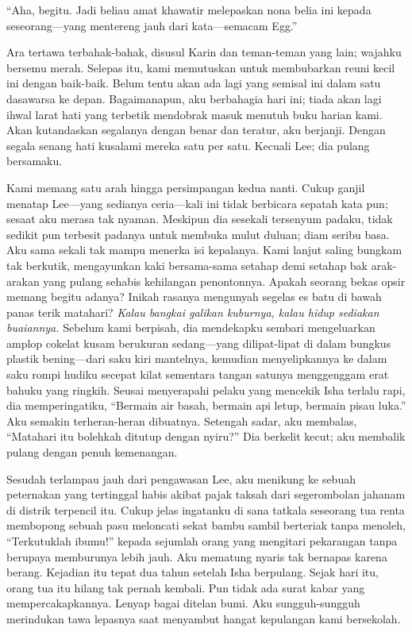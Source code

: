 \documentclass[smalldemyvopaper,11pt,twoside,onecolumn,openright,extrafontsizes]{memoir}
\begin{document}
``Aha, begitu. Jadi beliau amat khawatir melepaskan nona belia ini kepada seseorang---yang mentereng jauh dari kata---semacam Egg.''

Ara tertawa terbahak-bahak, disusul Karin dan teman-teman yang lain; wajahku bersemu merah. Selepas itu, kami memutuskan untuk membubarkan reuni kecil ini dengan baik-baik. Belum tentu akan ada lagi yang semisal ini dalam satu dasawarsa ke depan. Bagaimanapun, aku berbahagia hari ini; tiada akan lagi ihwal larat hati yang terbetik mendobrak masuk menutuh buku harian kami. Akan kutandaskan segalanya dengan benar dan teratur, aku berjanji. Dengan segala senang hati kusalami mereka satu per satu. Kecuali Lee; dia pulang bersamaku.


Kami memang satu arah hingga persimpangan kedua nanti. Cukup ganjil menatap Lee---yang sedianya ceria---kali ini tidak berbicara sepatah kata pun; sesaat aku merasa tak nyaman. Meskipun dia sesekali tersenyum padaku, tidak sedikit pun terbesit padanya untuk membuka mulut duluan; diam seribu basa. Aku sama sekali tak mampu menerka isi kepalanya. Kami lanjut saling bungkam tak berkutik, mengayunkan kaki bersama-sama setahap demi setahap bak arak-arakan yang pulang sehabis kehilangan penontonnya. Apakah seorang bekas opsir memang begitu adanya? Inikah rasanya mengunyah segelas es batu di bawah panas terik matahari? \textit{Kalau bangkai galikan kuburnya, kalau hidup sediakan buaiannya.} Sebelum kami berpisah, dia mendekapku sembari mengeluarkan amplop cokelat kusam berukuran sedang---yang dilipat-lipat di dalam bungkus plastik bening---dari saku kiri mantelnya, kemudian menyelipkannya ke dalam saku rompi hudiku secepat kilat sementara tangan satunya menggenggam erat bahuku yang ringkih. Seusai menyerapahi pelaku yang mencekik Isha terlalu rapi, dia memperingatiku, ``Bermain air basah, bermain api letup, bermain pisau luka.'' Aku semakin terheran-heran dibuatnya. Setengah sadar, aku membalas, ``Matahari itu bolehkah ditutup dengan nyiru?'' Dia berkelit kecut; aku membalik pulang dengan penuh kemenangan.


Sesudah terlampau jauh dari pengawasan Lee, aku menikung ke sebuah peternakan yang tertinggal habis akibat pajak taksah dari segerombolan jahanam di distrik terpencil itu. Cukup jelas ingatanku di sana tatkala seseorang tua renta membopong sebuah pasu meloncati sekat bambu sambil berteriak tanpa menoleh, ``Terkutuklah ibumu!'' kepada sejumlah orang yang mengitari pekarangan tanpa berupaya memburunya lebih jauh. Aku mematung nyaris tak bernapas karena berang. Kejadian itu tepat dua tahun setelah Isha berpulang. Sejak hari itu, orang tua itu hilang tak pernah kembali. Pun tidak ada surat kabar yang  mempercakapkannya. Lenyap bagai ditelan bumi. Aku sungguh-sungguh merindukan tawa lepasnya saat menyambut hangat kepulangan kami bersekolah.
\end{document}
